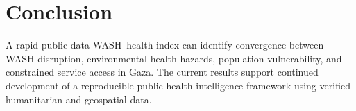 \section{Conclusion}

A rapid public-data WASH--health index can identify convergence between WASH disruption, environmental-health hazards, population vulnerability, and constrained service access in Gaza. The current results support continued development of a reproducible public-health intelligence framework using verified humanitarian and geospatial data.
